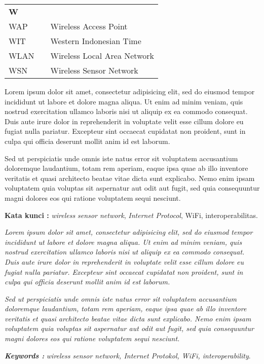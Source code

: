 \documentclass{mipathesis}
\begin{document}
\begin{tabular}{p{20pt}p{3pt}l}
\textbf{W}\\
WAP & & Wireless Access Point\\
WIT & & Western Indonesian Time\\
WLAN & & Wireless Local Area Network\\
WSN & & Wireless Sensor Network\\
\end{tabular}

\begin{abstractind}
Lorem ipsum dolor sit amet, consectetur adipisicing elit, sed do eiusmod tempor incididunt ut labore et dolore magna aliqua. Ut enim ad minim veniam, quis nostrud exercitation ullamco laboris nisi ut aliquip ex ea commodo consequat. Duis aute irure dolor in reprehenderit in voluptate velit esse cillum dolore eu fugiat nulla pariatur. Excepteur sint occaecat cupidatat non proident, sunt in culpa qui officia deserunt mollit anim id est laborum.

Sed ut perspiciatis unde omnis iste natus error sit voluptatem accusantium doloremque laudantium, totam rem aperiam, eaque ipsa quae ab illo inventore veritatis et quasi architecto beatae vitae dicta sunt explicabo. Nemo enim ipsam voluptatem quia voluptas sit aspernatur aut odit aut fugit, sed quia consequuntur magni dolores eos qui ratione voluptatem sequi nesciunt.


\bigskip
\noindent
\textbf{Kata kunci :} \emph{wireless sensor network}, \emph{Internet Protocol}, WiFi, interoperabilitas.
\end{abstractind}

\begin{abstracteng}
\emph{
Lorem ipsum dolor sit amet, consectetur adipisicing elit, sed do eiusmod tempor incididunt ut labore et dolore magna aliqua. Ut enim ad minim veniam, quis nostrud exercitation ullamco laboris nisi ut aliquip ex ea commodo consequat. Duis aute irure dolor in reprehenderit in voluptate velit esse cillum dolore eu fugiat nulla pariatur. Excepteur sint occaecat cupidatat non proident, sunt in culpa qui officia deserunt mollit anim id est laborum.}

\emph{Sed ut perspiciatis unde omnis iste natus error sit voluptatem accusantium doloremque laudantium, totam rem aperiam, eaque ipsa quae ab illo inventore veritatis et quasi architecto beatae vitae dicta sunt explicabo. Nemo enim ipsam voluptatem quia voluptas sit aspernatur aut odit aut fugit, sed quia consequuntur magni dolores eos qui ratione voluptatem sequi nesciunt.}

\bigskip
\noindent
\textbf{\emph{Keywords :}} \emph{wireless sensor network, Internet Protokol, WiFi, interoperability}.
\end{abstracteng}
\end{document}
